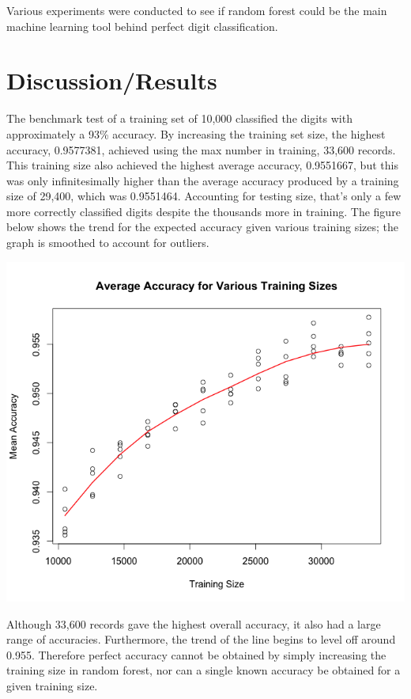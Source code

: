 \documentclass[a4paper]{article}
\begin{document}
\begin{doublespace}


Various experiments were conducted to see if random forest could be the main machine learning tool behind perfect digit classification.

\section{Discussion/Results}

The benchmark test of a training set of 10,000 classified the digits with approximately a 93\% accuracy. By increasing the training set size, the highest accuracy, 0.9577381, achieved using the max number in training, 33,600 records. This training size also achieved the highest average accuracy, 0.9551667, but this was only infinitesimally higher than the average accuracy produced by a training size of 29,400, which was 0.9551464. Accounting for testing size, that's only a few more correctly classified digits despite the thousands more in training. The figure below shows the trend for the expected accuracy given various training sizes; the graph is smoothed to account for outliers.

\begin{center}
\includegraphics[scale=0.5]{AAVTS.png}
\end{center}

Although 33,600 records gave the highest overall accuracy, it also had a large range of accuracies. Furthermore, the trend of the line begins to level off around 0.955. Therefore perfect accuracy cannot be obtained by simply increasing the training size in random forest, nor can a single known accuracy be obtained for a given training size.


\end{doublespace}
\end{document}
